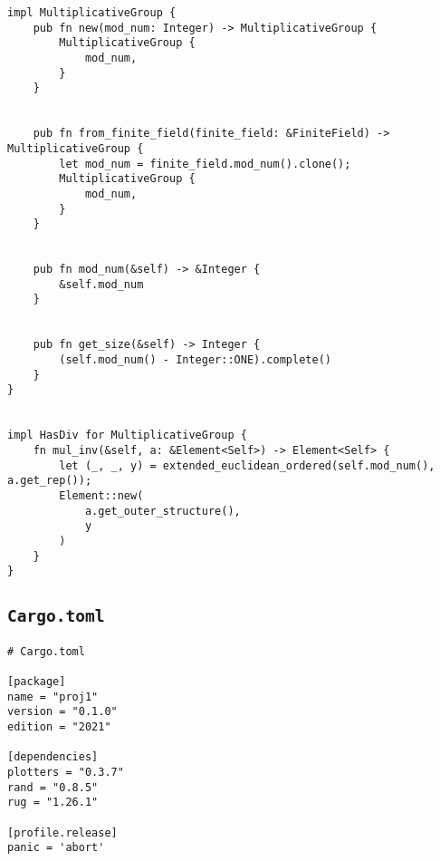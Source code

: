 \begin{verbatim}
impl MultiplicativeGroup {
    pub fn new(mod_num: Integer) -> MultiplicativeGroup {
        MultiplicativeGroup {
            mod_num,
        }
    }


    pub fn from_finite_field(finite_field: &FiniteField) -> MultiplicativeGroup {
        let mod_num = finite_field.mod_num().clone();
        MultiplicativeGroup {
            mod_num,
        }
    }


    pub fn mod_num(&self) -> &Integer {
        &self.mod_num
    }


    pub fn get_size(&self) -> Integer {
        (self.mod_num() - Integer::ONE).complete()
    }
}


impl HasDiv for MultiplicativeGroup {
    fn mul_inv(&self, a: &Element<Self>) -> Element<Self> {
        let (_, _, y) = extended_euclidean_ordered(self.mod_num(), a.get_rep());
        Element::new(
            a.get_outer_structure(),
            y
        )
    }
}
\end{verbatim}


\subsection{\lstinline{Cargo.toml}}

\begin{verbatim}
# Cargo.toml

[package]
name = "proj1"
version = "0.1.0"
edition = "2021"

[dependencies]
plotters = "0.3.7"
rand = "0.8.5"
rug = "1.26.1"

[profile.release]
panic = 'abort'
\end{verbatim}
